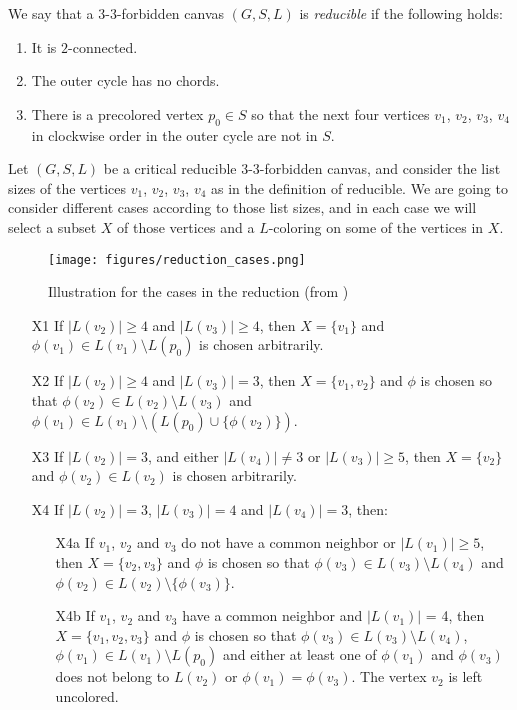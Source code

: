 \begin{definition}
We say that a 3-3-forbidden canvas $(G, S, L)$ is \emph{reducible} if the following holds:
\begin{enumerate}
	\item It is $2$-connected.
	\item The outer cycle has no chords.
	\item There is a precolored vertex $p_0 \in S$ so that the next four vertices 
	$v_1$, $v_2$, $v_3$, $v_4$ in clockwise order in the outer cycle are not in $S$. 
\end{enumerate}
\end{definition}

Let $(G, S, L)$ be a critical reducible 3-3-forbidden canvas, and consider the list sizes of
the vertices $v_1$, $v_2$, $v_3$, $v_4$ as in the definition of reducible. We are going to consider
different cases according to those list sizes, and in each case we will select a subset $X$ of those
vertices and a $L$-coloring on some of the vertices in $X$. 

\begin{figure}

\centering
\texttt{[image: figures/reduction\_cases.png]}
\caption{Illustration for the cases in the reduction (from \cite{crossingsfarapart})}
\label{fig:reductioncases}
\end{figure}

\begin{itemize}
	\item [X1] If $|L(v_2)| \geq 4$ and $|L(v_3)| \geq 4$, then $X = \{v_1\}$ and 
	$\phi(v_1) \in L(v_1) \setminus L(p_0)$ is chosen arbitrarily.
	\item [X2] If $|L(v_2)| \geq 4$ and $|L(v_3)| = 3$, then $X = \{v_1, v_2\}$ and $\phi$ is 
	chosen so that $\phi(v_2) \in L(v_2) \setminus L(v_3)$ and 
	$\phi(v_1) \in L(v_1) \setminus (L(p_0) \cup \{\phi(v_2)\})$.
	\item [X3] If $|L(v_2)| = 3$, and either $|L(v_4)| \neq 3$ or $|L(v_3)| \geq 5$, then 
	$X = \{v_2\}$ and $\phi(v_2) \in L(v_2)$ is chosen arbitrarily. 
	\item [X4] If $|L(v_2)| = 3$, $|L(v_3)| = 4$ and $|L(v_4)| = 3$, then:
	\begin{itemize}
		\item [X4a] If $v_1$, $v_2$ and $v_3$ do not have a common neighbor or 
		$|L(v_1)| \geq 5$, then $X = \{v_2, v_3\}$ and $\phi$ is chosen so that
		$\phi(v_3) \in L(v_3) \setminus L(v_4)$ and 
		$\phi(v_2) \in L(v_2) \setminus \{\phi(v_3)\}$.
		\item [X4b] If $v_1$, $v_2$ and $v_3$ have a common neighbor and $|L(v_1)|$ = 4, then
		$X = \{v_1, v_2, v_3\}$ and $\phi$ is chosen so that 
		$\phi(v_3) \in L(v_3) \setminus L(v_4)$, 
		$\phi(v_1) \in L(v_1) \setminus L(p_0)$ 
		and either at least one of $\phi(v_1)$ and $\phi(v_3)$
		does not belong to $L(v_2)$ or $\phi(v_1) = \phi(v_3)$. 
		The vertex $v_2$ is left uncolored.
	\end{itemize}
\end{itemize}

